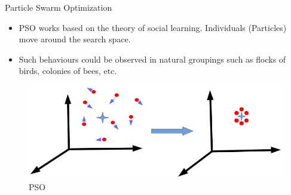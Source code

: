 \documentclass[table]{beamer}
\begin{document}
	\begin{frame}{Particle Swarm Optimization}
		\begin{block}{}
			\justifying
			\begin{itemize}
				\item PSO works based on the theory of social learning. Individuals (Particles) move around the search space.
				\newline\item Such behaviours could be observed in natural groupings such as flocks of birds, colonies of bees, etc.
			\end{itemize}
		\end{block}
		\begin{figure}[v]
			\includegraphics[scale=0.4]{pso1}
			\centering
			\caption{PSO}
			\label{ref:pso1}
		\end{figure}
	\end{frame}

\end{document}

